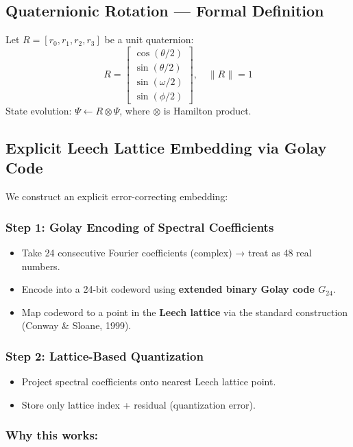 \documentclass[12pt]{article}
\begin{document}
\subsection{Quaternionic Rotation — Formal Definition}
Let $ R = [r_0, r_1, r_2, r_3] $ be a unit quaternion:
\[
R = \begin{bmatrix} \cos(\theta/2) \\ \sin(\theta/2) \\ \sin(\omega/2) \\ \sin(\phi/2) \end{bmatrix}, \quad \|R\| = 1
\]
State evolution: $ \Psi \leftarrow R \otimes \Psi $, where $ \otimes $ is Hamilton product.

\subsection{Explicit Leech Lattice Embedding via Golay Code}
We construct an explicit error-correcting embedding:

\subsubsection*{Step 1: Golay Encoding of Spectral Coefficients}
\begin{itemize}
    \item Take 24 consecutive Fourier coefficients (complex) → treat as 48 real numbers.
    \item Encode into a 24-bit codeword using \textbf{extended binary Golay code $ G_{24} $}.
    \item Map codeword to a point in the \textbf{Leech lattice} via the standard construction (Conway & Sloane, 1999).
\end{itemize}

\subsubsection*{Step 2: Lattice-Based Quantization}
\begin{itemize}
    \item Project spectral coefficients onto nearest Leech lattice point.
    \item Store only lattice index + residual (quantization error).
\end{itemize}

\subsubsection*{Why this works:}
\end{document}
